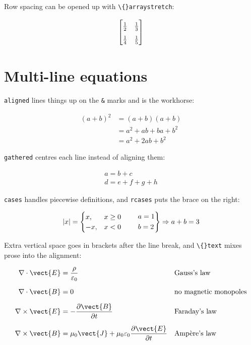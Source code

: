Row spacing can be opened up with \texttt{\textbackslash\{\}arraystretch}:

\[
\def\arraystretch{1.6}
\begin{bmatrix} \frac{1}{2} & \frac{1}{3} \\ \frac{1}{4} & \frac{1}{5} \end{bmatrix}
\]

\section{Multi-line equations}

\texttt{aligned} lines things up on the \texttt{\&} marks and is the workhorse:

\[
\begin{aligned}
(a + b)^2 &= (a + b)(a + b) \\
          &= a^2 + ab + ba + b^2 \\
          &= a^2 + 2ab + b^2
\end{aligned}
\]

\texttt{gathered} centres each line instead of aligning them:

\[
\begin{gathered}
a = b + c \\
d = e + f + g + h
\end{gathered}
\]

\texttt{cases} handles piecewise definitions, and \texttt{rcases} puts the brace on the right:

\[
|x| = \begin{cases}
  x, & x \ge 0 \\
  -x, & x < 0
\end{cases}
\qquad
\begin{rcases}
  a = 1 \\
  b = 2
\end{rcases} \Rightarrow a + b = 3
\]

Extra vertical space goes in brackets after the line break, and \texttt{\textbackslash\{\}text} mixes prose into the alignment:

\[
\begin{aligned}
\nabla \cdot \vect{E} &= \frac{\rho}{\varepsilon_0} && \text{Gauss's law} \\[6pt]
\nabla \cdot \vect{B} &= 0 && \text{no magnetic monopoles} \\[6pt]
\nabla \times \vect{E} &= -\frac{\partial \vect{B}}{\partial t} && \text{Faraday's law} \\[6pt]
\nabla \times \vect{B} &= \mu_0 \vect{J} + \mu_0 \varepsilon_0 \frac{\partial \vect{E}}{\partial t} && \text{Ampère's law}
\end{aligned}
\]

